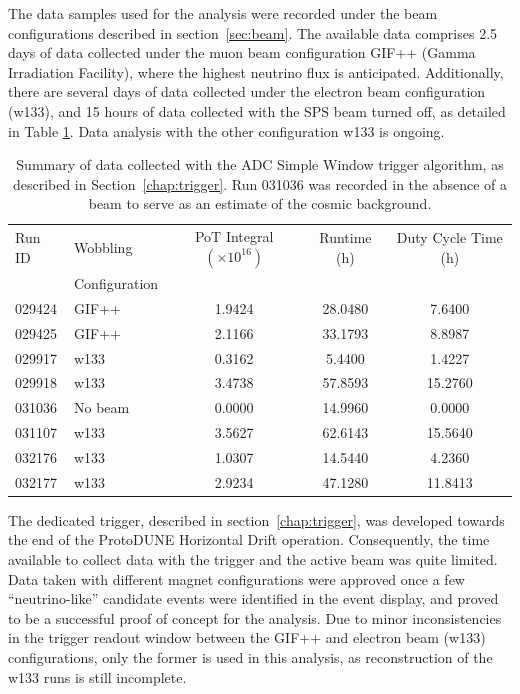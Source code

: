 The data samples used for the analysis were recorded under the beam configurations described in section~\ref{sec:beam}.
The available data comprises 2.5 days of data collected under the muon beam configuration GIF++ (Gamma Irradiation Facility), where the highest neutrino flux is anticipated. Additionally, there are several days of data collected under the electron beam configuration (w133), and 15 hours of data collected with the SPS beam turned off, as detailed in Table \ref{tab:data_table}. Data analysis with the other configuration w133 is ongoing.


\begin{table}[htbp]
\centering
\begin{tabularx}{\textwidth}{@{} l l c c c @{}}
\toprule
Run ID & Wobbling & PoT Integral $(\times 10^{16})$ & Runtime (h) & Duty Cycle Time (h) \\
       & Configuration &  &  &    \\
\midrule
029424 & GIF++   & 1.9424 & 28.0480 & 7.6400  \\
029425 & GIF++   & 2.1166 & 33.1793 & 8.8987  \\
029917 & w133    & 0.3162 & 5.4400  & 1.4227  \\
029918 & w133    & 3.4738 & 57.8593 & 15.2760 \\
031036 & No beam & 0.0000 & 14.9960 & 0.0000  \\
031107 & w133    & 3.5627 & 62.6143 & 15.5640 \\
032176 & w133    & 1.0307 & 14.5440 & 4.2360  \\
032177 & w133    & 2.9234 & 47.1280 & 11.8413 \\
\bottomrule
\end{tabularx}
\caption{Summary of data collected with the ADC Simple Window trigger algorithm, as described in Section~\ref{chap:trigger}. Run 031036 was recorded in the absence of a beam to serve as an estimate of the cosmic background.}
\label{tab:data_table}
\end{table}

The dedicated trigger, described in section~\ref{chap:trigger}, was developed towards the end of the ProtoDUNE Horizontal Drift operation. Consequently, the time available to collect data with the trigger and the active beam was quite limited. Data taken with different magnet configurations were approved once a few ``neutrino-like'' candidate events were identified in the event display, and proved to be a successful proof of concept for the analysis. Due to minor inconsistencies in the trigger readout window between the GIF++ and electron beam (w133) configurations, only the former is used in this analysis, as reconstruction of the w133 runs is still incomplete.  %

